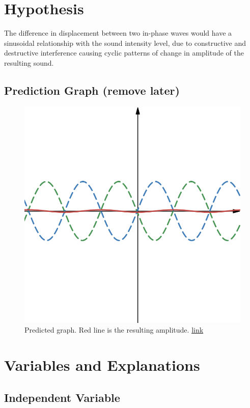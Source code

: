 \documentclass[index]{subfiles}
\begin{document}
\section{Hypothesis}

The difference in displacement between two in-phase waves would have a sinusoidal relationship with the sound intensity level, due to constructive and destructive interference causing cyclic patterns of change in amplitude of the resulting sound.

\subsection{Prediction Graph (remove later)}


\begin{figure}[H]
    \centering
    \includegraphics[scale=0.3]{prediction.png}
    \caption{Predicted graph. Red line is the resulting amplitude. \href{https://www.desmos.com/calculator/ahmohu46il}{link}}
\end{figure}

\section{Variables and Explanations}

\subsection{Independent Variable}
\end{document}
